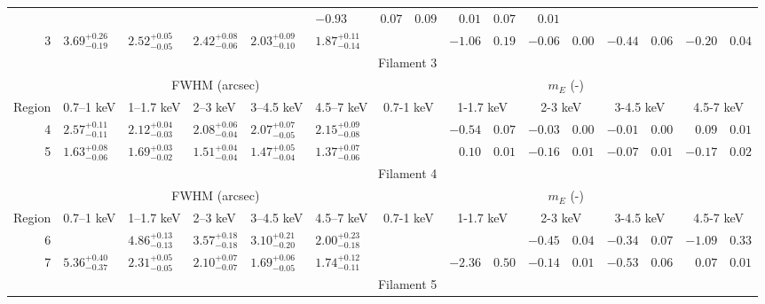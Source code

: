 \begin{tabular}{@{}rlllllr@{ $\pm$ }lr@{ $\pm$ }lr@{ $\pm$ }lr@{ $\pm$ }lr@{ $\pm$ }l@{}}
  & \multicolumn{4}{c}{} & $-0.93$ & $0.07$ & $0.09$ & $0.01$ & $0.07$ & $0.01$\\
3 & ${3.69}^{+0.26}_{-0.19}$ & ${2.52}^{+0.05}_{-0.05}$ & ${2.42}^{+0.08}_{-0.06}$ & ${2.03}^{+0.09}_{-0.10}$ & ${1.87}^{+0.11}_{-0.14}$
  & \multicolumn{2}{c}{} & $-1.06$ & $0.19$ & $-0.06$ & $0.00$ & $-0.44$ & $0.06$ & $-0.20$ & $0.04$\\
\midrule
{} & \multicolumn{15}{c}{Filament 3} \\
\cmidrule(l){2-16}
{} & \multicolumn{5}{c}{FWHM (arcsec)} & \multicolumn{10}{c}{$m_E$ (-)} \\
\cmidrule(l){2-6} \cmidrule(l){7-16}
Region & 0.7--1 keV & 1--1.7 keV & 2--3 keV & 3--4.5 keV & 4.5--7 keV
& \multicolumn{2}{c}{0.7-1 keV} & \multicolumn{2}{c}{1-1.7 keV}
& \multicolumn{2}{c}{2-3 keV} & \multicolumn{2}{c}{3-4.5 keV}
& \multicolumn{2}{c}{4.5-7 keV}\\
\midrule
4 & ${2.57}^{+0.11}_{-0.11}$ & ${2.12}^{+0.04}_{-0.03}$ & ${2.08}^{+0.06}_{-0.04}$ & ${2.07}^{+0.07}_{-0.05}$ & ${2.15}^{+0.09}_{-0.08}$
  & \multicolumn{2}{c}{} & $-0.54$ & $0.07$ & $-0.03$ & $0.00$ & $-0.01$ & $0.00$ & $0.09$ & $0.01$\\
5 & ${1.63}^{+0.08}_{-0.06}$ & ${1.69}^{+0.03}_{-0.02}$ & ${1.51}^{+0.04}_{-0.04}$ & ${1.47}^{+0.05}_{-0.04}$ & ${1.37}^{+0.07}_{-0.06}$
  & \multicolumn{2}{c}{} & $0.10$ & $0.01$ & $-0.16$ & $0.01$ & $-0.07$ & $0.01$ & $-0.17$ & $0.02$\\
\midrule
{} & \multicolumn{15}{c}{Filament 4} \\
\cmidrule(l){2-16}
{} & \multicolumn{5}{c}{FWHM (arcsec)} & \multicolumn{10}{c}{$m_E$ (-)} \\
\cmidrule(l){2-6} \cmidrule(l){7-16}
Region & 0.7--1 keV & 1--1.7 keV & 2--3 keV & 3--4.5 keV & 4.5--7 keV
& \multicolumn{2}{c}{0.7-1 keV} & \multicolumn{2}{c}{1-1.7 keV}
& \multicolumn{2}{c}{2-3 keV} & \multicolumn{2}{c}{3-4.5 keV}
& \multicolumn{2}{c}{4.5-7 keV}\\
\midrule
6 & {} & ${4.86}^{+0.13}_{-0.13}$ & ${3.57}^{+0.18}_{-0.18}$ & ${3.10}^{+0.21}_{-0.20}$ & ${2.00}^{+0.23}_{-0.18}$
  & \multicolumn{4}{c}{} & $-0.45$ & $0.04$ & $-0.34$ & $0.07$ & $-1.09$ & $0.33$\\
7 & ${5.36}^{+0.40}_{-0.37}$ & ${2.31}^{+0.05}_{-0.05}$ & ${2.10}^{+0.07}_{-0.07}$ & ${1.69}^{+0.06}_{-0.05}$ & ${1.74}^{+0.12}_{-0.11}$
  & \multicolumn{2}{c}{} & $-2.36$ & $0.50$ & $-0.14$ & $0.01$ & $-0.53$ & $0.06$ & $0.07$ & $0.01$\\
\midrule
{} & \multicolumn{15}{c}{Filament 5} \\

\end{tabular}
